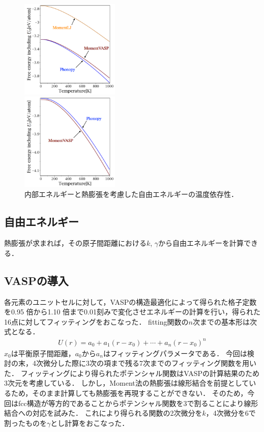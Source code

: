 \documentclass[10pt,twocolumn,a4j]{jsarticle}
\begin{document}
\begin{figure}[htb]
\begin{minipage}{0.245\hsize}
\begin{center}
\includegraphics[width=4.7cm]{./image_result/Au_free_u0_label.eps}
\end{center}
\end{minipage}
 \begin{minipage}{0.245\hsize}
\begin{center}
\includegraphics[width=4.7cm]{./image_result/Al_free_u0_label.eps}
\end{center}
\end{minipage}	
 \caption{内部エネルギーと熱膨張を考慮した自由エネルギーの温度依存性．}
\end{figure}

\subsection{自由エネルギー}
熱膨張が求まれば，その原子間距離における$k$, $\gamma$から自由エネルギーを計算できる．

\subsection{VASPの導入}
各元素のユニットセルに対して，VASPの構造最適化によって得られた格子定数を0.95
倍から1.10 倍まで0.01刻みで変化させエネルギーの計算を行い，得られた16点に対してフィッティングをおこなった．
fitting関数の$n$次までの基本形は次式となる．
\begin{eqnarray}
\label{eq:method2}
U(r)=a_0+a_1(r-x_0)+\cdots+a_n(r-x_0)^n
\end{eqnarray}
$x_0$は平衡原子間距離，$a_0$から$a_n$はフィッティングパラメータである．
今回は検討の末，4次微分した際に3次の項まで残る7次までのフィッティング関数を用いた．
フィッティングにより得られたポテンシャル関数はVASPの計算結果のため3次元を考慮している．
しかし，Moment法の熱膨張は線形結合を前提としているため，そのまま計算しても熱膨張を再現することができない．
そのため，今回はfcc構造が等方的であることからポテンシャル関数を3で割ることにより線形結合への対応を試みた．
これにより得られる関数の2次微分を$k$，4次微分を6で割ったものを$\gamma$とし計算をおこなった．
\end{document}
